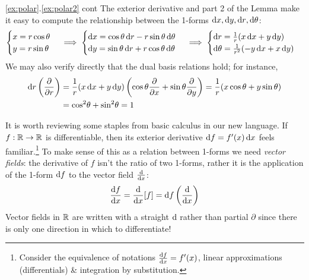 \begin{example*}{\ref*{ex:polar}.\ref*{ex:polar2} cont}{}
	The exterior derivative and part 2 of the Lemma make it easy to compute the relationship between the 1-forms $\dx,\dy,\dr,\dth$:
	\[
		\begin{cases}
			x=r\cos\theta\\
			y=r\sin\theta
		\end{cases}
		\implies 
		\begin{cases}
			\dx=\cos\theta\,\dr-r\sin\theta\,\dth\\
			\dy=\sin\theta\,\dr+r\cos\theta\,\dth
		\end{cases}
		\implies
		\begin{cases}
			\dr=\frac 1r(x\,\dx+y\,\dy)\\
			\dth=\frac 1{r^2}(-y\,\dx+x\,\dy)
		\end{cases}
	\]
	We may also verify directly that the dual basis relations hold; for instance,
	\begin{align*}
		\dr\left(\partials r\right) &=\frac 1r(x\,\dx+y\,\dy)\left(\cos\theta\partials x+\sin\theta\partials y\right) =\frac 1r(x\cos\theta+y\sin\theta)\\
		&=\cos^2\!\theta+\sin^2\!\theta=1
	\end{align*}
\end{example*}

\vfil\goodbreak




It is worth reviewing some staples from basic calculus in our new language.\smallbreak
If $f:\R\to\R$ is differentiable, then its exterior derivative $\df=f'(x)\,\dx$ feels familiar.\footnote{Consider the equivalence of notations $\diff[f]{x}=f'(x)$, linear approximations (differentials) \& integration by substitution.} To make sense of this as a relation between 1-forms we need \emph{vector fields}: the derivative of $f$ isn't the ratio of two 1-forms, rather it is the application of the 1-form $\df$ to the vector field $\diff x$:
\[
	\diff[f]{x}=\diff x[f]=\df\left(\diff x\right)
\]
Vector fields in $\R$ are written with a straight $\D$ rather than partial $\partial$ since there is only one direction in which to differentiate!\smallbreak

